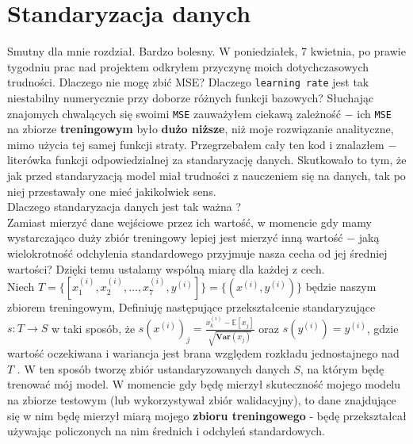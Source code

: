 \documentclass[polish,12pt,a4paper]{extarticle}
\begin{document}
\section*{Standaryzacja danych}
Smutny dla mnie rozdział. Bardzo bolesny. W poniedziałek, 7 kwietnia, po prawie tygodniu prac nad projektem odkryłem przyczynę moich dotychczasowych trudności. Dlaczego nie mogę zbić MSE? Dlaczego \texttt{learning rate} jest tak niestabilny numerycznie przy doborze różnych funkcji bazowych? Słuchając znajomych chwalących się swoimi \texttt{MSE} zauważyłem ciekawą zależność $-$ ich \texttt{MSE} na zbiorze \textbf{treningowym} było \textbf{dużo niższe}, niż moje rozwiązanie analityczne, mimo użycia tej samej funkcji straty. Przegrzebałem cały ten kod i znalazłem $-$ literówka funkcji odpowiedzialnej za standaryzację danych. Skutkowało to tym, że jak przed standaryzacją model miał trudności z nauczeniem się na danych, tak po niej przestawały one mieć jakikolwiek sens. \bigskip \\
Dlaczego standaryzacja danych jest tak ważna ? \\
Zamiast mierzyć dane wejściowe przez ich wartość, w momencie gdy mamy wystarczająco duży zbiór treningowy lepiej jest mierzyć inną wartość $-$ jaką wielokrotność odchylenia standardowego przyjmuje nasza cecha od jej średniej wartości? Dzięki temu ustalamy wspólną miarę dla każdej z cech. \bigskip \\
Niech $T = \{ [x^{(i)}_1, x^{(i)}_2, \dots, x^{(i)}_7, y^{(i)}] \} = \{(x^{(i)}, y^{(i)})\}$ będzie naszym zbiorem treningowym, Definiuję następujące przekształcenie standaryzujące $s: T \rightarrow S$ w taki sposób, że $s(x^{(i)})_j = \frac{x^{(i)}_k - \mathbb{E}[x_j]}{\sqrt{\mathbf{Var}(x_j)}}$ oraz $s(y^{(i)}) = y^{(i)}$, gdzie wartość oczekiwana i wariancja jest brana względem rozkładu jednostajnego nad $T$ . W ten sposób tworzę zbiór ustandaryzowanych danych $S$, na którym będę trenować mój model. W momencie gdy będę mierzył skuteczność mojego modelu na zbiorze testowym (lub wykorzystywał zbiór walidacyjny), to dane znajdujące się w nim będę mierzył miarą mojego \textbf{zbioru treningowego} - będę przekształcał używając policzonych na nim średnich i odchyleń standardowych. \bigskip \\
\end{document}
